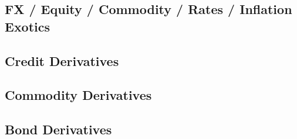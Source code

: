 \documentclass[12pt, a4paper]{article}
\begin{document}
\subsection{FX / Equity / Commodity / Rates / Inflation Exotics}


















\subsection{Credit Derivatives}







\subsection{Commodity Derivatives}










%
%

\subsection{Bond Derivatives}




\end{document}
